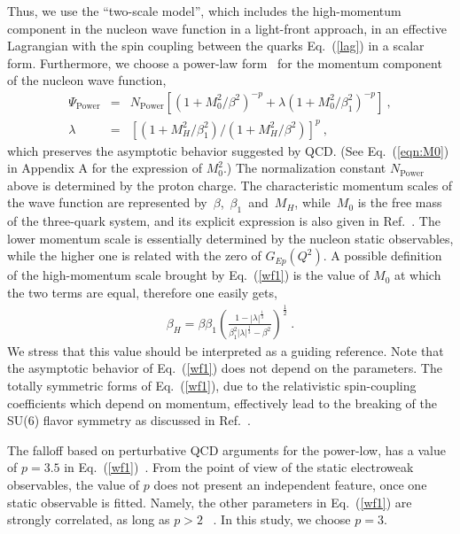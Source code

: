 \documentclass[preprint,aps,showpacs,floatfix]{revtex4}
\begin{document}
Thus, we use the ``two-scale model'', which includes the high-momentum component in the nucleon 
wave function in a light-front approach, in an effective 
Lagrangian with the spin coupling between the quarks Eq.~(\ref{lag}) in a scalar form. 
Furthermore, we choose a power-law form~\cite{bsch,brodsky} for the momentum
component of the nucleon wave function, 
\begin{eqnarray}
\Psi_{\mathrm{Power}} &=& N_{\mathrm{Power}}\left[(1+M^2_0/\beta^2)^{-p}
+\lambda (1+M^2_0/\beta_1^2)^{-p} \right]\ , 
\label{wf1}\\
\lambda &=& \left[ (1 + M_H^2/\beta_1^2)/(1 + M_H^2/\beta^2) \right]^p\ ,
\label{lambda}
\end{eqnarray}
which preserves the asymptotic behavior suggested by QCD.  
(See Eq.~(\ref{eqn:M0}) in Appendix A for the expression of $M^2_0$.)
The normalization constant $N_{\mathrm{Power}}$ above is determined by the proton charge. 
The characteristic momentum scales of the wave
function are represented by~$\beta$,~$\beta_1$~and~$M_H$, while~$M_0$ is the free mass 
of the three-quark system, and its explicit expression 
is also given in Ref.~\cite{afsbw}. 
The lower momentum scale is essentially 
determined by the nucleon static observables, while the higher one is
related with the zero of $G_{Ep}(Q^2)$. A possible definition of the
high-momentum scale brought by Eq.~(\ref{wf1}) is the value of
$M_0$ at which the two terms are equal, therefore one easily gets, 
\begin{eqnarray}
\beta_H = \beta\beta_1 \left( \frac{1-|\lambda|^{\frac{1}{3}}}
{\beta_1^2|\lambda|^{\frac{1}{3}}-\beta^2} \right)^{\frac{1}{2}}~. 
\label{bh}
\end{eqnarray}
We stress that this value should be interpreted as a guiding
reference. Note that the asymptotic behavior of
Eq.~(\ref{wf1}) does not depend on the parameters.  
The totally symmetric forms of Eq.~(\ref{wf1}), due to the relativistic 
spin-coupling coefficients which depend on momentum, effectively lead
to the breaking of the SU(6) flavor symmetry as discussed in
Ref.~\cite{simula00}.


The falloff based on perturbative QCD arguments for the power-low, 
has a value of $p=3.5$ in Eq.~(\ref{wf1})~\cite{bsch,brodsky}. 
From the point of view of the static electroweak observables, the value of
$p$ does not present an independent feature, once one static
observable is fitted. Namely, the other parameters in Eq.~(\ref{wf1})  
are strongly correlated, as long as $p>2$ ~\cite{afsbw,bsch}. 
In this study, we choose $p=3$.
\end{document}
